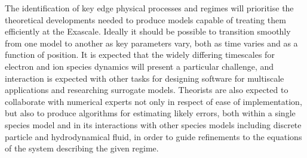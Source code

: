 The identification of key edge physical processes and regimes will prioritise 
the theoretical developments needed to produce models capable of treating them 
efficiently at the Exascale. Ideally it should be possible to transition smoothly 
from one model to another as key parameters vary, both as time varies and as a 
function of position. It is expected that the widely differing timescales for 
electron and ion species dynamics will present a particular challenge, and 
interaction is expected with other tasks for designing software for multiscale 
applications and researching surrogate models. Theorists are also expected to 
collaborate with numerical experts not only in respect of ease of implementation, 
but also to produce algorithms for estimating likely errors, both within a 
single species model and in its interactions with other species models 
including discrete particle and hydrodynamical fluid, in order to guide refinements 
to the equations of the system describing the given regime.

